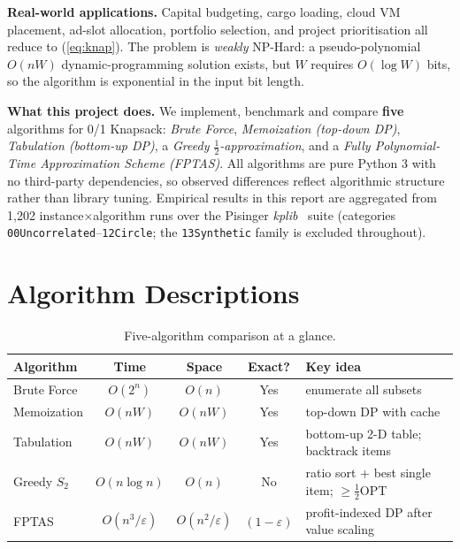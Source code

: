 \documentclass[11pt, a4paper]{article}
\begin{document}
\textbf{Real-world applications.} Capital budgeting, cargo loading, cloud VM
placement, ad-slot allocation, portfolio selection, and project prioritisation
all reduce to (\ref{eq:knap}). The problem is \emph{weakly} NP-Hard: a
pseudo-polynomial $O(nW)$ dynamic-programming solution exists, but $W$ requires
$O(\log W)$ bits, so the algorithm is exponential in the input bit length.

\textbf{What this project does.} We implement, benchmark and compare \textbf{five}
algorithms for 0/1 Knapsack: \emph{Brute Force}, \emph{Memoization (top-down
DP)}, \emph{Tabulation (bottom-up DP)}, a \emph{Greedy $\tfrac{1}{2}$-approximation},
and a \emph{Fully Polynomial-Time Approximation Scheme (FPTAS)}. All algorithms
are pure Python 3 with no third-party dependencies, so observed differences
reflect algorithmic structure rather than library tuning. Empirical results in
this report are aggregated from 1{,}202 instance$\times$algorithm runs over the
Pisinger \emph{kplib}~\cite{pisinger2003,kplib} suite (categories
\texttt{00Uncorrelated}--\texttt{12Circle}; the \texttt{13Synthetic} family is
excluded throughout).

\section{Algorithm Descriptions}

\begin{table}[H]
\centering
\caption{Five-algorithm comparison at a glance.}
\small
\begin{tabular}{@{}lcccp{4.6cm}@{}}
\toprule
\textbf{Algorithm} & \textbf{Time} & \textbf{Space} & \textbf{Exact?} & \textbf{Key idea} \\
\midrule
Brute Force        & $O(2^n)$        & $O(n)$       & Yes & enumerate all subsets \\
Memoization        & $O(nW)$         & $O(nW)$      & Yes & top-down DP with cache \\
Tabulation         & $O(nW)$         & $O(nW)$      & Yes & bottom-up 2-D table; backtrack items \\
Greedy $S_2$       & $O(n\log n)$    & $O(n)$       & No  & ratio sort + best single item; $\ge\tfrac{1}{2}$OPT \\
FPTAS              & $O(n^3/\varepsilon)$ & $O(n^2/\varepsilon)$ & $(1-\varepsilon)$ & profit-indexed DP after value scaling \\
\bottomrule
\end{tabular}
\end{table}
\end{document}
